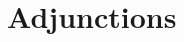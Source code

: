 \documentclass[main.tex]{subfiles}
\begin{document}
\chapter{Adjunctions}
% 
% 
% 
% 
% 
% 
\end{document}
